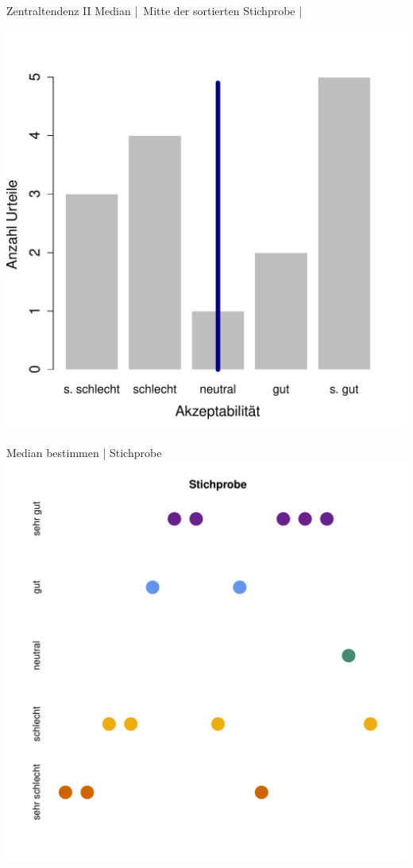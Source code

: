\begin{frame}
  {Zentraltendenz II}
  \alert{Median} | \alert{Mitte der sortierten Stichprobe} | \\
  \Zeile
  \begin{center}
    \includegraphics[height=0.6\textheight]{RVorlesung/median}
  \end{center}
  \Zeile
\end{frame}

\begin{frame}
  {Median bestimmen | Stichprobe}
  \centering 
  \includegraphics[height=0.9\textheight]{RVorlesung/median1a}
\end{frame}

